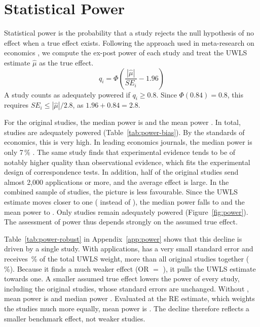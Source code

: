 \documentclass[11pt,a4paper]{article}
\begin{document}
\section{Statistical Power}

Statistical power is the probability that a study rejects the null
hypothesis of no effect when a true effect exists. Following the approach
used in meta-research on economics \citep{ioannidis2017,askarov2024}, we compute the
ex-post power of each study and treat the UWLS estimate $\hat\mu$ as the
true effect.
\begin{equation}
  q_i = \Phi\left(\frac{|\hat\mu|}{SE_i} - 1.96\right)
\end{equation}
A study counts as adequately powered if $q_i \geq 0.8$. Since $\Phi(0.84) = 0.8$, this requires $SE_i \leq |\hat\mu| / 2.8$, as $1.96 + 0.84 = 2.8$.



For the \maK{} original studies, the median power is \maMedPower{} and the
mean power \maMeanPower. In total, \maNadequate{} studies are adequately
powered (Table~\ref{tab:power-bias}). By the standards of economics, this
is very high. In leading economics journals, the median power is only
7\,\% \citep{askarov2024}. The same study finds that experimental evidence
tends to be of notably higher quality than observational evidence, which
fits the experimental design of correspondence tests. In addition, half of
the original studies send almost 2{,}000 applications or more, and the
average effect is large. In the combined sample of \maKcomb{} studies, the
picture is less favourable. Since the UWLS estimate moves closer to one
(\maORuwlsComb{} instead of \maORuwls), the median power falls to \maMedPowerComb{}
and the mean power to \maMeanPowerComb. Only \maNadequateComb{} studies
remain adequately powered (Figure~\ref{fig:power}). The assessment of power
thus depends strongly on the assumed true effect.

Table~\ref{tab:power-robust} in Appendix~\ref{app:power} shows that this
decline is driven by a single study. With \maNkline{} applications,
\citet{kline2022} has a very small standard error and receives
\maWshareKline\,\% of the total UWLS weight, more than all \maK{} original
studies together (\maWshareOrig\,\%). Because it finds a much weaker effect
(OR $=$ \maORkline), it pulls the UWLS estimate towards one. A smaller
assumed true effect lowers the power of every study, including the original
studies, whose standard errors are unchanged. Without \citet{kline2022},
mean power is \maMeanPowerNoKline{} and median power \maMedPowerNoKline.
Evaluated at the RE estimate, which weights the studies much more equally,
mean power is \maMeanPowerCombRE. The decline therefore reflects a smaller
benchmark effect, not weaker studies.
\end{document}
